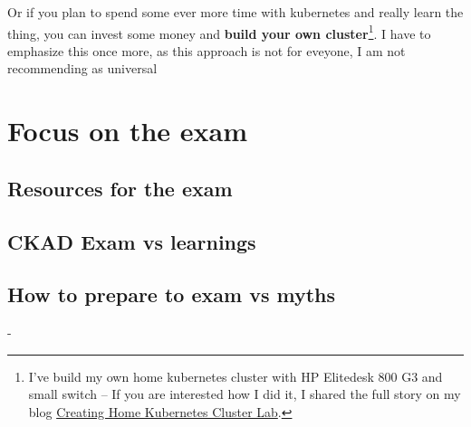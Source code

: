 Or if you plan to spend some ever more time with kubernetes and really learn the thing, you can invest some money and \textbf{build your own cluster}\footnote{I've build my own home kubernetes cluster with HP Elitedesk 800 G3 and small switch -- If you are interested how I did it, I shared the full story on my blog \href{https://egel.github.io/2024/08/26/home-k8s-cluster.html}{Creating Home Kubernetes Cluster Lab}.}. I have to emphasize this once more, as this approach is not for eveyone, I am not recommending as universal 

\section{Focus on the exam}
\label{sec:focus-on-exam}


\subsection{Resources for the exam}


\subsection{CKAD Exam vs learnings}

\subsection{How to prepare to exam vs myths}

- 
